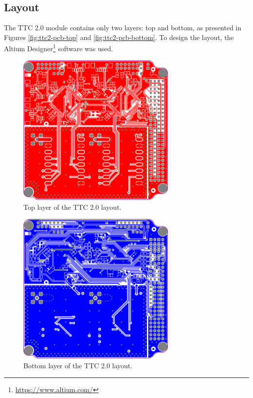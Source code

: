 \subsection{Layout}

The TTC 2.0 module contains only two layers: top and bottom, as presented in Figures \ref{fig:ttc2-pcb-top} and \ref{fig:ttc2-pcb-bottom}. To design the layout, the Altium Designer\footnote{\href{https://www.altium.com/}{https://www.altium.com/}} software was used.

\begin{figure}[!ht]
    \begin{center}
        \includegraphics[width=0.7\textwidth]{figures/ttc2-layout-top.png}
        \caption{Top layer of the TTC 2.0 layout.}
        \label{fig:ttc2-layout-top}
    \end{center}
\end{figure}

\begin{figure}[!ht]
    \begin{center}
        \includegraphics[width=0.7\textwidth]{figures/ttc2-layout-bottom.png}
        \caption{Bottom layer of the TTC 2.0 layout.}
        \label{fig:ttc2-layout-bottom}
    \end{center}
\end{figure}

